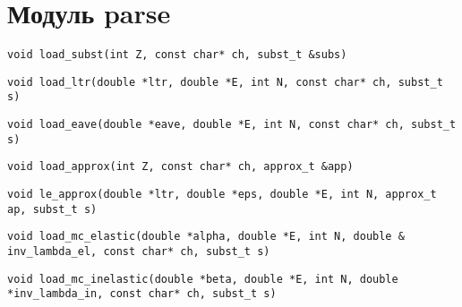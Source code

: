 \section{Модуль parse}

\begin{verbatim}
void load_subst(int Z, const char* ch, subst_t &subs)
\end{verbatim}

\begin{verbatim}
void load_ltr(double *ltr, double *E, int N, const char* ch, subst_t s)
\end{verbatim}

\begin{verbatim}
void load_eave(double *eave, double *E, int N, const char* ch, subst_t s)
\end{verbatim}

\begin{verbatim}
void load_approx(int Z, const char* ch, approx_t &app)
\end{verbatim}

\begin{verbatim}
void le_approx(double *ltr, double *eps, double *E, int N, approx_t ap, subst_t s)
\end{verbatim}

\begin{verbatim}
void load_mc_elastic(double *alpha, double *E, int N, double & inv_lambda_el, const char* ch, subst_t s)
\end{verbatim}

\begin{verbatim}
void load_mc_inelastic(double *beta, double *E, int N, double *inv_lambda_in, const char* ch, subst_t s)
\end{verbatim}
